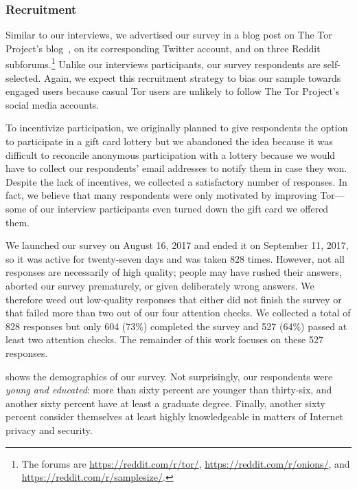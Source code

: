 \subsubsection{Recruitment}

Similar to our interviews, we advertised our survey \first in a blog post on The Tor
Project's blog~\cite{Winter2017a}, \second on its corresponding Twitter account,
and \third on three Reddit subforums.\footnote{The forums are
\url{https://reddit.com/r/tor/}, \url{https://reddit.com/r/onions/}, and
\url{https://reddit.com/r/samplesize/}.}  Unlike our interviews participants,
our survey respondents are self-selected.  Again, we expect this recruitment
strategy to bias our sample towards engaged users because casual Tor users are
unlikely to follow The Tor Project's social media accounts.

To incentivize participation, we originally planned to give respondents the
option to participate in a gift card lottery but we abandoned the idea because
it was difficult to reconcile anonymous participation with a lottery because we
would have to collect our respondents' email addresses to notify them in case
they won.  Despite the lack of incentives, we collected a satisfactory number of
responses.  In fact, we believe that many respondents were only motivated by
improving Tor---some of our interview participants even turned down the gift
card we offered them.

We launched our survey on August 16, 2017 and ended it on September 11, 2017, so
it was active for twenty-seven days and was taken 828 times.  However, not all
responses are necessarily of high quality; people may have rushed their answers,
aborted our survey prematurely, or given deliberately wrong answers.  We
therefore weed out low-quality responses that either did not finish the survey
or that failed more than two out of our four attention checks.  We collected a
total of 828 responses but only 604 (73\%) completed the survey and 527 (64\%)
passed at least two attention checks.  The remainder of this work focuses on
these 527 responses.

 shows the demographics of our survey.  Not
surprisingly, our respondents were \emph{young and educated}: more than sixty
percent are younger than thirty-six, and another sixty percent have at least a
graduate degree.  Finally, another sixty percent consider themselves at least
highly knowledgeable in matters of Internet privacy and security.

